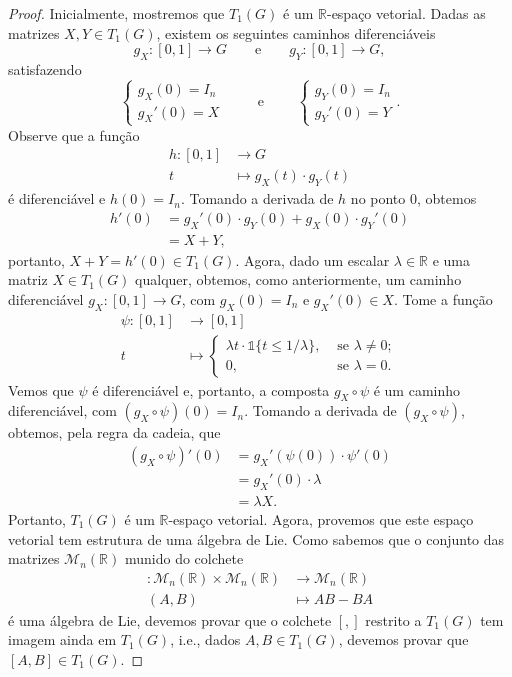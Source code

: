 \documentclass[twoside,openright,titlepage,numbers=noenddot,headinclude,  lineheaders footinclude=true,cleardoublepage=empty,
                                BCOR=5mm,paper=a4,fontsize=12pt ]{scrbook}
\theoremstyle{definition}
\begin{document}
\begin{proof}
Inicialmente, mostremos que $T_1(G)$ é um $\mathbb{R}$-espaço vetorial. 
Dadas as matrizes $X, Y \in T_1(G)$, existem os seguintes caminhos 
diferenciáveis
\[ g_X: [0,1] \rightarrow G \qquad \text{e} \qquad g_Y: [0,1] \rightarrow G, \]
satisfazendo
\[
    \begin{cases}
     g_X(0)  = I_n\\
     g_X'(0)  = X 
   \end{cases}
	\qquad 
	\text{ e }
	\qquad
    \begin{cases}
     g_Y(0)  = I_n\\
     g_Y'(0)  = Y 
   \end{cases}
   .
\]
Observe que a função
\begin{align*}
h: [0,1] & \rightarrow G\\
     t   & \mapsto g_X(t) \cdot g_Y(t)
\end{align*}
é diferenciável e $h(0) = I_n$. Tomando a derivada de $h$ no ponto $0$, obtemos
\begin{align*}
h'(0) & = g_X'(0) \cdot g_Y(0) + g_X(0) \cdot g_Y'(0)\\
      & = X + Y,
\end{align*}
portanto, $X + Y = h'(0) \in T_1(G)$. Agora, dado um escalar $\lambda \in \mathbb{R}$ e uma matriz $X \in T_1(G)$ qualquer, obtemos, como anteriormente,
um caminho diferenciável $g_X:[0,1] \rightarrow G$, com $g_X(0) = I_n$ e $g_X'(0) \in X$. Tome a função
\begin{align*}
\psi: [0,1] & \rightarrow [0,1]\\
	t   & \mapsto 
    \begin{cases}
     \lambda t  \cdot \mathbb{1}\{ t \leq 1/ \lambda \}, & \text{ se } \lambda \neq 0; \\
     0, & \text{ se } \lambda = 0.
   \end{cases}
\end{align*} 
Vemos que $\psi$ é diferenciável e, portanto, a composta $g_X \circ \psi$ é um caminho diferenciável, com $(g_X \circ \psi) (0) = I_n$.
Tomando a derivada de $(g_X \circ \psi)$, obtemos, pela regra da cadeia, que
\begin{align*}
(g_X \circ \psi)'(0)  & =  g_X'( \psi(0) ) \cdot \psi'(0) \\
		      & = g_X'(0) \cdot \lambda \\
		      & = \lambda X.
\end{align*}
Portanto, $T_1(G)$ é um $\mathbb{R}$-espaço vetorial.
Agora, provemos que este espaço vetorial tem estrutura de uma álgebra de Lie. Como sabemos que o conjunto das matrizes $\mathcal{M}_n(\mathbb{R})$
munido do colchete
\begin{align*}
[,] : \mathcal{M}_n(\mathbb{R}) \times \mathcal{M}_n(\mathbb{R}) & \rightarrow \mathcal{M}_n(\mathbb{R})\\
(A, B) & \mapsto AB - BA
\end{align*}
é uma álgebra de Lie, devemos provar que o colchete $[,]$ restrito a $T_1(G)$ tem imagem ainda em $T_1(G)$, i.e., dados $A, B \in T_1(G)$, devemos provar que 
$[A, B] \in T_1(G)$.


\end{proof}
\end{document}
